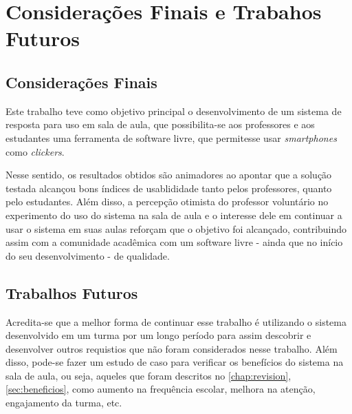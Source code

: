 \chapter{Considerações Finais e Trabahos Futuros}

\section{Considerações Finais}

Este trabalho teve como objetivo principal o desenvolvimento de um sistema de resposta para uso em sala de aula,
que possibilita-se aos professores e aos estudantes uma ferramenta de software livre,
que permitesse usar {\textit{smartphones}} como \textit{clickers}.

Nesse sentido, os resultados obtidos são animadores ao apontar que a solução testada alcançou bons índices
de usablididade tanto pelos professores, quanto pelo estudantes. Além disso, a percepção otimista
do professor voluntário no experimento do uso do sistema na sala de aula e o interesse dele
em continuar a usar o sistema em suas aulas reforçam que o objetivo foi alcançado, contribuindo assim
com a comunidade acadêmica com um software livre - ainda que no início do seu desenvolvimento - de qualidade.

\section{Trabalhos Futuros}

Acredita-se que a melhor forma de continuar esse trabalho é utilizando o sistema
desenvolvido em um turma por um longo período para assim descobrir e desenvolver outros requistios que não
foram considerados nesse trabalho. Além disso, pode-se fazer um estudo de caso para verificar os benefícios
do sistema na sala de aula, ou seja, aqueles que foram descritos no \autoref{chap:revision}, \autoref{sec:beneficios},
como aumento na frequência escolar, melhora na atenção, engajamento da turma, etc.

